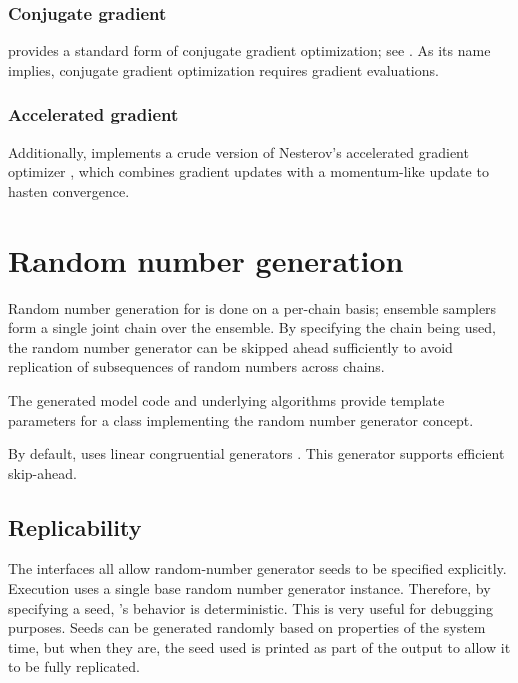 \documentclass[article]{jss}
\begin{document}
\subsubsection{Conjugate gradient}

 provides a standard form of conjugate gradient
optimization; see \citep{NocedalWright:2006}.  As its name implies,
conjugate gradient optimization requires gradient evaluations.

\subsubsection{Accelerated gradient}

Additionally,  implements a crude version of Nesterov's
accelerated gradient optimizer \cite{Nesterov:1983}, which combines
gradient updates with a momentum-like update to hasten convergence.

\section{Random number generation}\label{rng.section}

Random number generation for  is done on a per-chain
basis; ensemble samplers form a single joint chain over the ensemble.  By
specifying the chain being used, the random number generator can be
skipped ahead sufficiently to avoid replication of subsequences of
random numbers across chains.

The generated model code and underlying  algorithms
provide template parameters for a class implementing the 
random number generator concept.  

By default,  uses linear congruential generators
\citep{LEcuyer:1988}.  This generator supports efficient skip-ahead.

\subsection{Replicability}

The  interfaces all allow random-number generator seeds
to be specified explicitly.  Execution uses a single base random
number generator instance.  Therefore, by specifying a seed,
's behavior is deterministic.  This is very useful for
debugging purposes.  Seeds can be generated randomly based on
properties of the system time, but when they are, the seed used is
printed as part of the output to allow it to be fully replicated.
\end{document}
